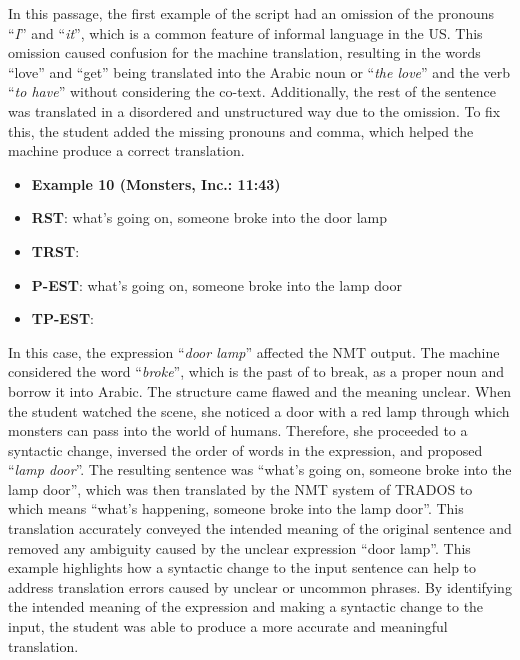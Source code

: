 \documentclass[english]{textolivre}
\begin{document}
In this passage, the first example of the script had an omission of the pronouns “\emph{I}” and “\emph{it}”, which is a common feature of informal language in the US. This omission caused confusion for the machine translation, resulting in the words “love” and “get” being translated into the Arabic noun  or “\emph{the love}” and the verb  “\emph{to have}” without considering the co-text. Additionally, the rest of the sentence was translated in a disordered and unstructured way due to the omission. To fix this, the student added the missing pronouns and comma, which helped the machine produce a correct translation.

\begin{itemize}
\item \textbf{Example 10 (Monsters, Inc.: 11:43)}
\item \textbf{RST}: what’s going on, someone broke into the door lamp
\item \textbf{TRST}: 
\item \textbf{P-EST}: what’s going on, someone broke into the lamp door
\item \textbf{TP-EST}: 
\end{itemize}

In this case, the expression “\emph{door lamp}” affected the NMT output. The machine considered the word “\emph{broke}”, which is the past of to break, as a proper noun and borrow it into Arabic. The structure came flawed and the meaning unclear. When the student watched the scene, she noticed a door with a red lamp through which monsters can pass into the world of humans. Therefore, she proceeded to a syntactic change, inversed the order of words in the expression, and proposed “\emph{lamp door}”. The resulting sentence was “what’s going on, someone broke into the lamp door”, which was then translated by the NMT system of TRADOS to  which means “what’s happening, someone broke into the lamp door”. This translation accurately conveyed the intended meaning of the original sentence and removed any ambiguity caused by the unclear expression “door lamp”. This example highlights how a syntactic change to the input sentence can help to address translation errors caused by unclear or uncommon phrases. By identifying the intended meaning of the expression and making a syntactic change to the input, the student was able to produce a more accurate and meaningful translation.
\end{document}
